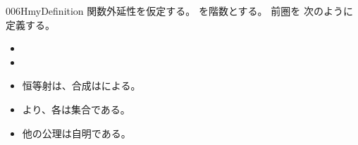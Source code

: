 \documentclass[index]{subfiles}
\begin{document}
\begin{myBlock}{006H}{myDefinition}
  関数外延性を仮定する。
  を階数とする。
  前圏を
  次のように定義する。
  \begin{itemize}
  \item {}
  \item {}
  \item 恒等射は、合成はによる。
  \item {}より、各は集合である。
  \item 他の公理は自明である。
  \end{itemize}
\end{myBlock}
\end{document}
